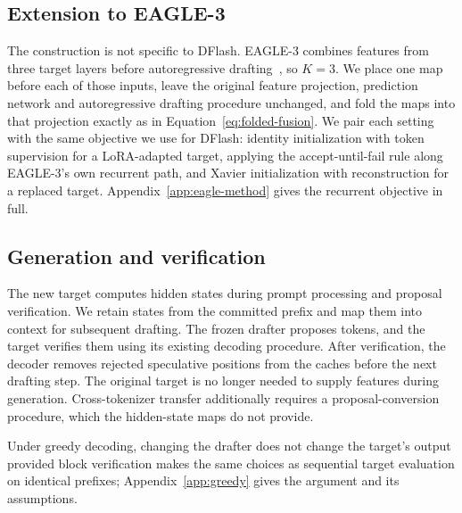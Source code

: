 \subsection{Extension to EAGLE-3}
\label{sec:method-eagle}
The construction is not specific to DFlash. EAGLE-3 combines features from three target layers before autoregressive drafting~\citep{li2025eagle3}, so $K=3$. We place one map before each of those inputs, leave the original feature projection, prediction network and autoregressive drafting procedure unchanged, and fold the maps into that projection exactly as in Equation~\ref{eq:folded-fusion}. We pair each setting with the same objective we use for DFlash: identity initialization with token supervision for a LoRA-adapted target, applying the accept-until-fail rule along EAGLE-3's own recurrent path, and Xavier initialization with reconstruction for a replaced target. Appendix~\ref{app:eagle-method} gives the recurrent objective in full.

\subsection{Generation and verification}
\label{sec:method-generation}
The new target computes hidden states during prompt processing and proposal verification. We retain states from the committed prefix and map them into context for subsequent drafting. The frozen drafter proposes tokens, and the target verifies them using its existing decoding procedure. After verification, the decoder removes rejected speculative positions from the caches before the next drafting step. The original target is no longer needed to supply features during generation. Cross-tokenizer transfer additionally requires a proposal-conversion procedure, which the hidden-state maps do not provide.

Under greedy decoding, changing the drafter does not change the target's output provided block verification makes the same choices as sequential target evaluation on identical prefixes; Appendix~\ref{app:greedy} gives the argument and its assumptions.

